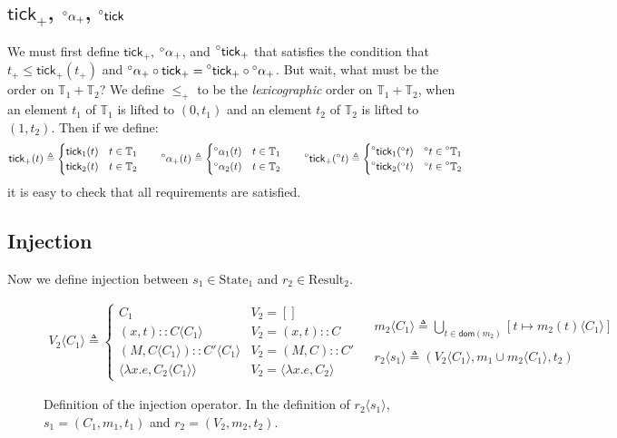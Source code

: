 \documentclass{article}
\theoremstyle{definition}
\newcommand*{\cons}{::}
\newcommand*{\A}[1]{\prescript{\circ}{}{#1}}
\newcommand*{\Time}{\mathbb{T}}
\newcommand*{\mem}{m}
\newcommand*{\State}{\text{State}}
\newcommand*{\Result}{\text{Result}}
\newcommand*{\tick}{\mathsf{tick}}
\newcommand*{\inject}[2]{{#2}\langle{#1}\rangle}
\begin{document}
\subsection{$\tick_+$, $\A\alpha_+$, $\A\tick$}
We must first define $\tick_+$, $\A\alpha_+$, and $\A\tick_+$ that satisfies the condition that $t_+\le \tick_+(t_+)$ and $\A\alpha_+\circ\tick_+=\A\tick_+\circ\A\alpha_+$.
But wait, what must be the order on $\Time_1+\Time_2$?
We define $\le_+$ to be the \emph{lexicographic} order on $\Time_1+\Time_2$, when an element $t_1$ of $\Time_1$ is lifted to $(0,t_1)$ and an element $t_2$ of $\Time_2$ is lifted to $(1,t_2)$.
Then if we define:
\[
  \tick_+(t)\triangleq
  \begin{cases}
    \tick_1(t) & t\in\Time_1 \\
    \tick_2(t) & t\in\Time_2
  \end{cases}\qquad
  \A\alpha_+(t)\triangleq
  \begin{cases}
    \A\alpha_1(t) & t\in\Time_1 \\
    \A\alpha_2(t) & t\in\Time_2
  \end{cases}\qquad
  \A\tick_+(\A{t})\triangleq
  \begin{cases}
    \A\tick_1(\A{t}) & \A{t}\in\A\Time_1 \\
    \A\tick_2(\A{t}) & \A{t}\in\A\Time_2
  \end{cases}
\]
it is easy to check that all requirements are satisfied.

\subsection{Injection}
Now we define injection between $s_1\in\State_1$ and $r_2\in\Result_2$.
\begin{figure}[h!]
  \[
    \begin{array}{cc}
      \inject{C_{1}}{V_{2}}\triangleq
      \begin{cases}
        C_1                                           & V_{2}=[]                            \\
        (x, t)\cons\inject{C_{1}}{C}                  & V_{2}=(x,t)\cons C                  \\
        (M, \inject{C_{1}}{C})\cons\inject{C_{1}}{C'} & V_{2}=(M,C)\cons C'                 \\
        \langle\lambda x.e,\inject{C_1}{C_2}\rangle   & V_{2}=\langle\lambda x.e,C_2\rangle
      \end{cases} &
      \begin{array}{l}
        \inject{C_1}{\mem_2}\triangleq
        \displaystyle\bigcup_{t\in\mathsf{dom}(\mem_2)}[t\mapsto\inject{C_1}{\mem_2(t)}] \\ \\
        \inject{s_1}{r_2}\triangleq
        (\inject{C_1}{V_2},\mem_1\cup\inject{C_1}{\mem_2},t_2)
      \end{array}
    \end{array}
  \]
  \caption{Definition of the injection operator.
    In the definition of $\inject{s_1}{r_2}$, $s_1=(C_1,\mem_1,t_1)$ and $r_2=(V_2,\mem_2,t_2)$.}
  \label{fig:concinject}
\end{figure}
\end{document}
